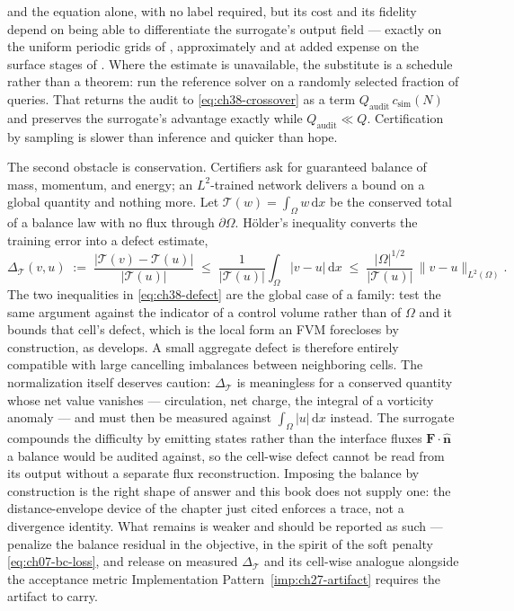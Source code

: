 and the equation alone, with no label required, but its cost and its fidelity depend on being
able to differentiate the surrogate's output field --- exactly on the uniform periodic grids
of , approximately and at added
expense on the surface stages of . Where the estimate is
unavailable, the substitute is a schedule rather than a theorem: run the reference
solver on a randomly selected fraction of queries. That returns the audit to
\eqref{eq:ch38-crossover} as a term $Q_{\mathrm{audit}}\,c_{\mathrm{sim}}(N)$ and preserves
the surrogate's advantage exactly while $Q_{\mathrm{audit}}\ll Q$. Certification by sampling
is slower than inference and quicker than hope.

The second obstacle is conservation. Certifiers ask for guaranteed balance of mass,
momentum, and energy; an $L^2$-trained network delivers a bound on a global quantity and
nothing more. Let $\mathcal{T}(w)=\int_{\Omega}w\,\mathrm{d}x$ be the conserved total of a balance law
with no flux through $\partial\Omega$. H{\"o}lder's inequality converts the training error
into a defect estimate,
\begin{equation}
  \Delta_{\mathcal{T}}(v,u)
  \;:=\;
  \frac{\big|\mathcal{T}(v)-\mathcal{T}(u)\big|}{\big|\mathcal{T}(u)\big|}
  \;\le\;
  \frac{1}{\big|\mathcal{T}(u)\big|}\int_{\Omega}\!\big|v-u\big|\,\mathrm{d}x
  \;\le\;
  \frac{|\Omega|^{1/2}}{\big|\mathcal{T}(u)\big|}\,\big\|v-u\big\|_{L^{2}(\Omega)}.
  \label{eq:ch38-defect}
\end{equation}
The two inequalities in \eqref{eq:ch38-defect} are the global case of a family: test the same
argument against the indicator of a control volume rather than of $\Omega$ and it bounds that
cell's defect, which is the local form an FVM forecloses by construction, as
 develops. A small aggregate
defect is therefore entirely compatible with large cancelling imbalances between neighboring
cells. The
normalization itself deserves caution: $\Delta_{\mathcal{T}}$ is meaningless for a conserved quantity
whose net value vanishes --- circulation, net charge, the integral of a vorticity anomaly --- and
must then be measured against $\int_{\Omega}|u|\,\mathrm{d}x$ instead. The surrogate compounds
the difficulty by emitting states rather than the interface fluxes
$\mathbf{F}\cdot\hat{\mathbf{n}}$ a balance would be audited against, so the cell-wise defect
cannot be read from its output without a separate flux reconstruction. Imposing the balance by
construction is the right shape of answer and this book does not supply one: the
distance-envelope device of the chapter just cited enforces a trace, not a divergence
identity. What remains is weaker and should be reported as such --- penalize the balance
residual in the objective, in the spirit of the soft penalty \eqref{eq:ch07-bc-loss}, and
release on measured $\Delta_{\mathcal{T}}$ and its cell-wise analogue alongside the acceptance metric
Implementation Pattern~\ref{imp:ch27-artifact} requires the artifact to carry.

